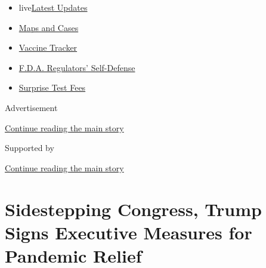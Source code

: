 \begin{itemize}
\tightlist
\item
  live\href{https://www.nytimes3xbfgragh.onion/2020/09/12/world/covid-19-coronavirus.html?name=styln-coronavirus-national\&region=TOP_BANNER\&block=storyline_menu_recirc\&action=click\&pgtype=Article\&impression_id=412ccd10-f52d-11ea-96a2-f52873655d97\&variant=undefined}{Latest
  Updates}
\item
  \href{https://www.nytimes3xbfgragh.onion/interactive/2020/us/coronavirus-us-cases.html?name=styln-coronavirus-national\&region=TOP_BANNER\&block=storyline_menu_recirc\&action=click\&pgtype=Article\&impression_id=412ccd11-f52d-11ea-96a2-f52873655d97\&variant=undefined}{Maps
  and Cases}
\item
  \href{https://www.nytimes3xbfgragh.onion/interactive/2020/science/coronavirus-vaccine-tracker.html?name=styln-coronavirus-national\&region=TOP_BANNER\&block=storyline_menu_recirc\&action=click\&pgtype=Article\&impression_id=412ccd12-f52d-11ea-96a2-f52873655d97\&variant=undefined}{Vaccine
  Tracker}
\item
  \href{https://www.nytimes3xbfgragh.onion/2020/09/10/us/politics/fda-coronavirus-vaccine.html?name=styln-coronavirus-national\&region=TOP_BANNER\&block=storyline_menu_recirc\&action=click\&pgtype=Article\&impression_id=412ccd13-f52d-11ea-96a2-f52873655d97\&variant=undefined}{F.D.A.
  Regulators' Self-Defense}
\item
  \href{https://www.nytimes3xbfgragh.onion/2020/09/09/upshot/coronavirus-surprise-test-fees.html?name=styln-coronavirus-national\&region=TOP_BANNER\&block=storyline_menu_recirc\&action=click\&pgtype=Article\&impression_id=412ccd14-f52d-11ea-96a2-f52873655d97\&variant=undefined}{Surprise
  Test Fees}
\end{itemize}

Advertisement

\protect\hyperlink{after-top}{Continue reading the main story}

Supported by

\protect\hyperlink{after-sponsor}{Continue reading the main story}

\hypertarget{sidestepping-congress-trump-signs-executive-measures-for-pandemic-relief}{%
\section{Sidestepping Congress, Trump Signs Executive Measures for
Pandemic
Relief}\label{sidestepping-congress-trump-signs-executive-measures-for-pandemic-relief}}

